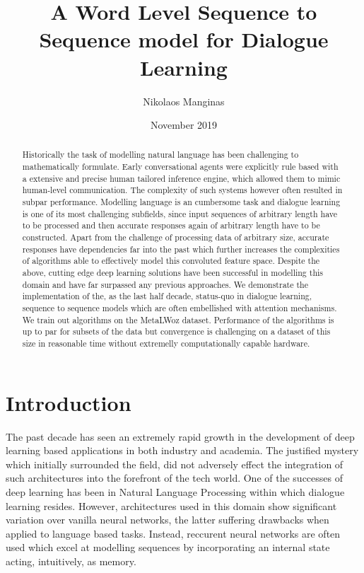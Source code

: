 \documentclass{article}
\title{A Word Level Sequence to Sequence model for Dialogue Learning}
\author{Nikolaos Manginas}
\date{November 2019}
\begin{document}
\maketitle
    
\begin{abstract}
    Historically the task of modelling natural language has been challenging to mathematically formulate. Early conversational agents were explicitly rule based with a extensive and precise human tailored inference engine, which allowed them to mimic human-level communication. The complexity of such systems however often resulted in subpar performance. Modelling language is an cumbersome task and dialogue learning is one of its most challenging subfields, since input sequences of arbitrary length have to be processed and then accurate responses again of arbitrary length have to be constructed. Apart from the challenge of processing data of arbitrary size, accurate responses have dependencies far into the past which further increases the complexities of algorithms able to effectively model this convoluted feature space. Despite the above, cutting edge deep learning solutions have been successful in modelling this domain and have far surpassed any previous approaches. We demonstrate the implementation of the, as the last half decade, status-quo in dialogue learning, sequence to sequence models\cite{seq} which are often embellished with attention mechanisms\cite{attention}. We train out algorithms on the MetaLWoz dataset. Performance of the algorithms is up to par for subsets of the data but convergence is challenging on a dataset of this size in reasonable time without extremelly computationally capable hardware.
    
\end{abstract}

\section{Introduction}
    The past decade has seen an extremely rapid growth in the development of deep learning based applications in both industry and academia. The justified mystery which initially surrounded the field, did not adversely effect the integration of such architectures into the forefront of the tech world. One of the successes of deep learning has been in Natural Language Processing within which dialogue learning resides. However, architectures used in this domain show significant variation over vanilla neural networks, the latter suffering drawbacks when applied to language based tasks. Instead, reccurent neural networks are often used which excel at modelling sequences by incorporating an internal state acting, intuitively, as memory. 
    
\end{document}
